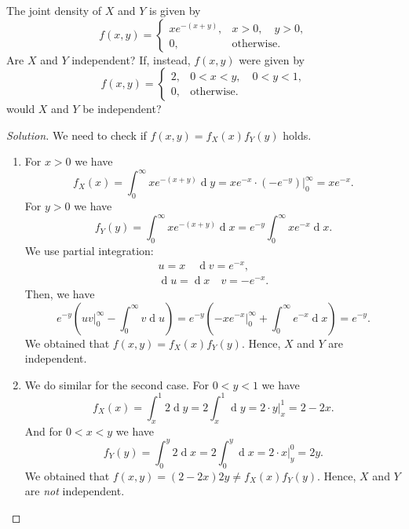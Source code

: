 \documentclass{article}[12pt]
\newenvironment{solution}
  {\renewcommand\qedsymbol{$\blacksquare$}\begin{proof}[Solution]}
  {\end{proof}}
\newenvironment{problem}[1]
  {\renewcommand\theinnercustomprblm{#1}\innercustomprblm}
  {\endinnercustomprblm}
\DeclareMathOperator{\dif}{d}
\begin{document}
\begin{problem}{6.20}\normalfont
The joint density of $X$ and $Y$ is given by
\begin{equation*}
    f(x, y) = 
    \begin{cases}
        xe^{-(x+y)}, &x > 0,\quad y > 0,
        \\
        0, &\text{otherwise}.
    \end{cases}
\end{equation*}
Are $X$ and $Y$ independent? 
If, instead, $f(x, y)$ were given by
\begin{equation*}
    f(x, y) = 
    \begin{cases}
        2, &0 < x < y,\quad 0 < y < 1,
        \\
        0, &\text{otherwise}.
    \end{cases}
\end{equation*}
would $X$ and $Y$ be independent?
\end{problem}
\begin{solution}
We need to check if $f(x, y) = f_{X}(x)f_{Y}(y)$ holds.
\begin{enumerate}
    \item For $x > 0$ we have
    \begin{equation*}
        f_{X}(x) = \int_{0}^{\infty}xe^{-(x+y)}\dif y = xe^{-x}\cdot\left(-e^{-y}\right)\Big|_{0}^{\infty} = xe^{-x}.
    \end{equation*}
    For $y > 0$ we have
    \begin{equation*}
        f_{Y}(y) = \int_{0}^{\infty}xe^{-(x+y)}\dif x = e^{-y}\int_{0}^{\infty}xe^{-x}\dif x.
    \end{equation*}
    We use partial integration:
    \begin{gather*}
        u = x\quad \dif v = e^{-x},
        \\
        \dif u = \dif x\quad v = -e^{-x}.
    \end{gather*}
    Then, we have
    \begin{equation*}
        e^{-y}\left(uv\Big|_{0}^{\infty} - \int_{0}^{\infty}v\dif u\right) = e^{-y}\left(-xe^{-x}\Big|_{0}^{\infty} + \int_{0}^{\infty}e^{-x}\dif x\right) = e^{-y}.
    \end{equation*}   
    We obtained that $f(x, y) = f_{X}(x)f_{Y}(y)$.
    Hence, $X$ and $Y$ are independent.
    \item We do similar for the second case.
    For $0 < y < 1$ we have
    \begin{equation*}
        f_{X}(x) = \int_{x}^{1}2\dif y = 2\int_{x}^{1}\dif y = 2\cdot y\Big|_{x}^{1} = 2 - 2x.
    \end{equation*}
    And for $0 < x < y$ we have
    \begin{equation*}
        f_{Y}(y) = \int_{0}^{y}2\dif x = 2\int_{0}^{y}\dif x = 2\cdot x\Big|_{y}^{0} = 2y.
    \end{equation*}
    We obtained that $f(x, y) = (2 -2x)2y \neq f_{X}(x)f_{Y}(y)$.
    Hence, $X$ and $Y$ are \textit{not} independent.
\end{enumerate}
\end{solution}
\end{document}
